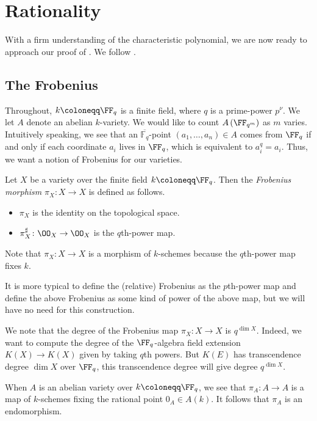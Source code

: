 \documentclass{amsart}
\begin{document}
\section{Rationality} \label{sec:rat}
With a firm understanding of the characteristic polynomial, we are now ready to approach our proof of . We follow \cite[Chapter~16]{egm-av}.

\subsection{The Frobenius}
Throughout, $k\coloneqq\FF_q$ is a finite field, where $q$ is a prime-power $p^\nu$. We let $A$ denote an abelian $k$-variety. We would like to count $A\left(\FF_{q^m}\right)$ as $m$ varies. Intuitively speaking, we see that an $\overline{\mathbb F_q}$-point $(a_1,\ldots,a_n)\in A$ comes from $\FF_q$ if and only if each coordinate $a_i$ lives in $\FF_q$, which is equivalent to $a_i^q=a_i$. Thus, we want a notion of Frobenius for our varieties.
\begin{definition}[Frobenius] \label{def:frob}
	Let $X$ be a variety over the finite field $k\coloneqq\FF_q$. Then the \textit{Frobenius morphism} $\pi_X\colon X\to X$ is defined as follows.
	\begin{itemize}
		\item $\pi_X$ is the identity on the topological space.
		\item $\pi_X^\sharp\colon\OO_X\to\OO_X$ is the $q$th-power map.
	\end{itemize}
	Note that $\pi_X\colon X\to X$ is a morphism of $k$-schemes because the $q$th-power map fixes $k$.
\end{definition}
\begin{remark}
	It is more typical to define the (relative) Frobenius as the $p$th-power map and define the above Frobenius as some kind of power of the above map, but we will have no need for this construction.
\end{remark}
\begin{remark} \label{rem:deg-of-frob}
	We note that the degree of the Frobenius map $\pi_X\colon X\to X$ is $q^{\dim X}$. Indeed, we want to compute the degree of the $\FF_q$-algebra field extension $K(X)\to K(X)$ given by taking $q$th powers. But $K(E)$ has transcendence degree $\dim X$ over $\FF_q$, this transcendence degree will give degree $q^{\dim X}$.
\end{remark}
\begin{remark} \label{rem:frob-is-endo}
	When $A$ is an abelian variety over $k\coloneqq\FF_q$, we see that $\pi_A\colon A\to A$ is a map of $k$-schemes fixing the rational point $0_A\in A(k)$. It follows that $\pi_A$ is an endomorphism.
\end{remark}
\end{document}
